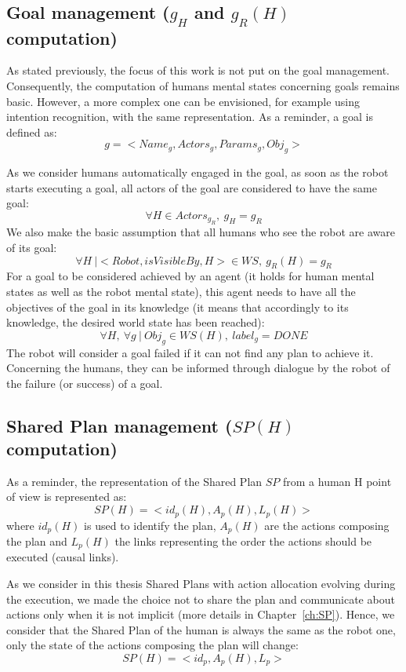 \documentclass[english,a4paper,11pt,twoside]{StyleThese}
\begin{document}
\subsection{Goal management ($g_H$ and $g_R(H)$ computation)}

As stated previously, the focus of this work is not put on the goal management. Consequently, the computation of humans mental states concerning goals remains basic. However, a more complex one can be envisioned, for example using intention recognition, with the same representation. As a reminder, a goal is defined as:
$$g = <Name_g, Actors_g, Params_g, Obj_g>$$

As we consider humans automatically engaged in the goal, as soon as the robot starts executing a goal, all actors of the goal are considered to have the same goal:
$$ \forall H \in Actors_{g_R}, \ g_H = g_R$$
We also make the basic assumption that all humans who see the robot are aware of its goal:
$$ \forall H  \ | <Robot, isVisibleBy, H> \in WS, \ g_R(H) = g_R$$
For a goal to be considered achieved by an agent (it holds for human mental states as well as the robot mental state), this agent needs to have all the objectives of the goal in its knowledge (it means that accordingly to its knowledge, the desired world state has been reached):
$$ \forall H, \ \forall g  \ | \ Obj_g \in WS(H), \ label_g = DONE$$
The robot will consider a goal failed if it can not find any plan to achieve it. Concerning the humans, they can be informed through dialogue by the robot of the failure (or success) of a goal.

\subsection{Shared Plan management ($SP(H)$ computation)}

As a reminder, the representation of the Shared Plan $SP$ from a human H point of view is represented as:
$$SP(H) = <id_p(H), A_p(H), L_p(H)>$$
where $id_p(H)$ is used to identify the plan, $A_p(H)$ are the actions composing the plan and $L_p(H)$ the links representing the order the actions should be executed (causal links).

As we consider in this thesis Shared Plans with action allocation evolving during the execution, we made the choice not to share the plan and communicate about actions only when it is not implicit (more details in Chapter~\ref{ch:SP}). Hence, we consider that the Shared Plan of the human is always the same as the robot one, only the state of the actions composing the plan will change:
$$SP(H) = <id_p, A_p(H), L_p>$$
\end{document}
